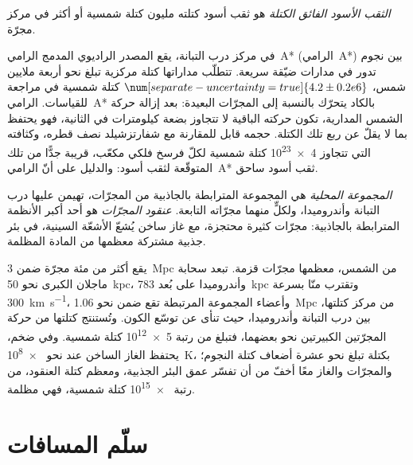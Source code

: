 \begin{definition}\label{def:b3:milky-way-galaxies:smbh}
\emph{الثقب الأسود الفائق الكتلة} هو ثقب أسود
كتلته مليون كتلة شمسية أو أكثر في مركز مجرّة.
\end{definition}

في مركز درب التبانة، يقع المصدر الراديوي المدمج الرامي~A*
(الرامي~A*) بين نجوم تدور في مدارات ضيّقة سريعة. تتطلّب مداراتها
كتلة مركزية تبلغ نحو أربعة ملايين شمس، $\num[separate-uncertainty=true]{4.2 \pm 0.2 e6}$
كتلة شمسية في مراجعة للقياسات. الرامي~A* بالكاد يتحرّك
بالنسبة إلى المجرّات البعيدة: بعد إزالة حركة الشمس المدارية، تكون حركته
الباقية لا تتجاوز بضعة كيلومترات في الثانية، فهو يحتفظ بما لا يقلّ
عن ربع تلك الكتلة. حجمه قابل للمقارنة مع شفارتزشيلد
نصف قطره، وكثافته التي تتجاوز \num{4e23} كتلة شمسية لكلّ
فرسخ فلكي مكعّب، قريبة جدًّا من تلك المتوقّعة لثقب أسود: والدليل
على أنّ الرامي~A* ثقب أسود ساحق.

\begin{definition}\label{def:b3:milky-way-galaxies:groups}
\emph{المجموعة المحلية} هي المجموعة المترابطة بالجاذبية
من المجرّات، تهيمن عليها درب التبانة وأندروميدا، ولكلٍّ منهما
مجرّاته التابعة. \emph{عنقود المجرّات} هو
أحد أكبر الأنظمة المترابطة بالجاذبية: مجرّات كثيرة محتجزة،
مع غاز ساخن يُشعّ الأشعّة السينية، في بئر جذبية مشتركة معظمها من المادة
المظلمة.
\end{definition}

يقع أكثر من مئة مجرّة ضمن \qty{3}{Mpc} من الشمس، معظمها
مجرّات قزمة. تبعد سحابة ماجلان الكبرى نحو \qty{50}{kpc}، وأندروميدا على
بُعد \qty{783}{kpc} وتقترب منّا بسرعة \qty{300}{km.s^{-1}}، وأعضاء المجموعة المرتبطة
تقع ضمن نحو \qty{1.06}{Mpc} من مركز كتلتها،
بين درب التبانة وأندروميدا، حيث تنأى عن
توسّع الكون. وتُستنتج كتلتها من حركة المجرّتين الكبيرتين
نحو بعضهما، فتبلغ من رتبة \num{5e12} كتلة شمسية. وفي
 ضخم، يحتفظ الغاز الساخن عند نحو \qty{e8}{K}، بكتلة تبلغ نحو عشرة
أضعاف كتلة النجوم؛ والمجرّات والغاز معًا أخفّ من أن تفسّر عمق
البئر الجذبية، ومعظم كتلة العنقود،
من رتبة \num{e15} كتلة شمسية، فهي مظلمة.

\section{سلّم المسافات}\label{sec:b3:milky-way-galaxies:ladder}

